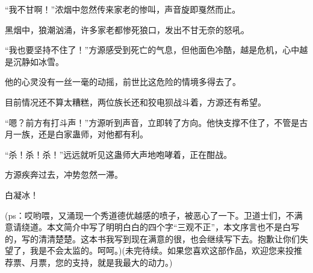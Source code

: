 \begin{this_body}
“我不甘啊！”浓烟中忽然传来家老的惨叫，声音旋即戛然而止。

黑烟中，狼潮汹涌，许多家老都惨死狼口，发出不甘无奈的怒吼。

“我也要坚持不住了！”方源感受到死亡的气息，但他面色冷酷，越是危机，心中越是沉静如冰雪。

他的心灵没有一丝一毫的动摇，前世比这危险的情境多得去了。

目前情况还不算太糟糕，两位族长还和狡电狈战斗着，方源还有希望。

“嗯？前方有打斗声！”方源听到声音，立即转了方向。他快支撑不住了，不管是古月一族，还是白家蛊师，对他都有利。

“杀！杀！杀！”远远就听见这蛊师大声地咆哮着，正在酣战。

方源疾奔过去，冲势忽然一滞。

白凝冰！

(ps：哎哟喂，又涌现一个秀道德优越感的喷子，被恶心了一下。卫道士们，不满意请绕道。本文简介中写了明明白白的四个字“三观不正”，本文序言也不是白写的，写的清清楚楚。这本书我写到现在满意的很，也会继续写下去。抱歉让你们失望了，我是不会太监的。呵呵。)(未完待续。如果您喜欢这部作品，欢迎您来投推荐票、月票，您的支持，就是我最大的动力。)

\end{this_body}

